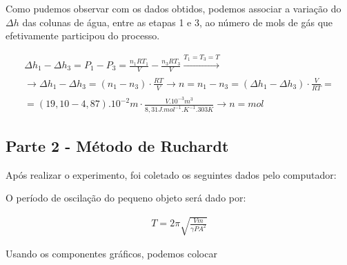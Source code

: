 \documentclass[a4paper]{ltxdoc}
\numberwithin{equation}{section}
\begin{document}
 \vspace{\baselineskip}

Como pudemos observar com os dados obtidos, podemos associar a variação do $\Delta h$ das colunas de água, entre as etapas 1 e 3, ao número de mols de gás que efetivamente participou do processo.

\begin{align}
     \Delta h_1 -\Delta h_3 = P_1 - P_3 = \frac{n_1RT_1} {V} - \frac{n_3RT_3} {V} \xrightarrow[]{T_1 = T_3= T} \\
    \xrightarrow[]{} \Delta h_1 - \Delta h_3 = (n_1 - n_3) \cdot \frac{RT} {V} \xrightarrow[]{} n = n_1 - n_3 = \left ( \Delta h_1 - \Delta h_3 \right ) \cdot \frac{V} {RT} = \\
    = \left (19,10 - 4,87 \right).10^{-2}m \cdot \frac{V .10^{-3}m^3} {8,31 J.mol^{-1}.K^{-1}. 303 K} \xrightarrow[]{} n =  mol
\end{align}







\subsection{Parte 2 - Método de Ruchardt}

Após realizar o experimento, foi coletado os seguintes dados pelo computador:

\vspace{\baselineskip}

\noindent
\begin{minipage}{\linewidth}
\label{fig:risco1}
\end{minipage}

\vspace{\baselineskip}

\begin{tcolorbox}[colback=white, colframe=blue!40!black, title=\textbf{Tempo de oscilação} ]

O período de oscilação do pequeno objeto será dado por:

\begin{align}
T = 2\pi \sqrt{ \frac{Vm}{\gamma PA^2} }
\label{eq:speed2}
\end{align}

Usando os componentes gráficos, podemos colocar

\end{tcolorbox} 
\end{document}
